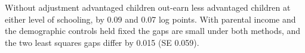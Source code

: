 Without adjustment advantaged children out-earn less advantaged children at either level of schooling, by 0.09 and 0.07 log points. With parental income and the demographic controls held fixed the gaps are small under both methods, and the two least squares gaps differ by 0.015 (SE 0.059).%
